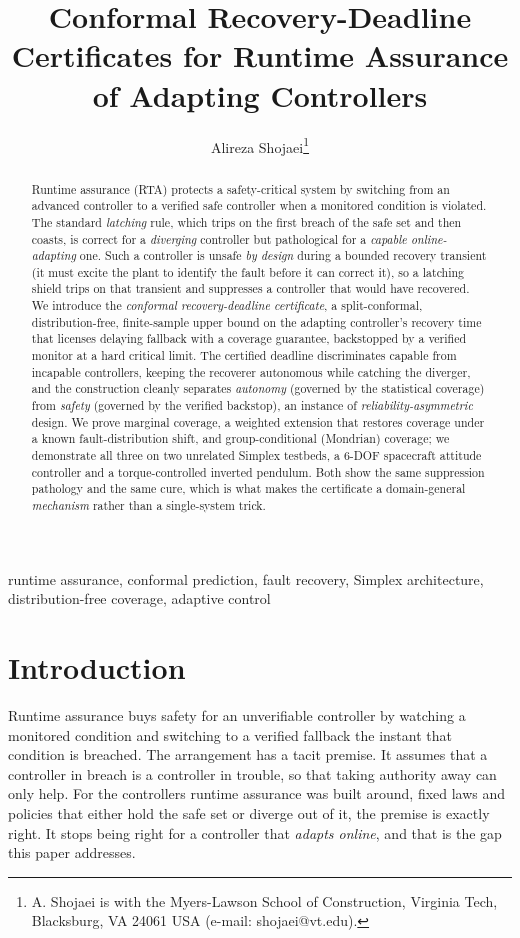 \documentclass[journal]{IEEEtran}
\title{Conformal Recovery-Deadline Certificates for Runtime Assurance of
Adapting Controllers}
\author{Alireza Shojaei\thanks{A. Shojaei is with the Myers-Lawson School of Construction, Virginia Tech, Blacksburg, VA 24061 USA (e-mail: shojaei@vt.edu).}}
\theoremstyle{plain}
\theoremstyle{definition}
\begin{document}
\maketitle

\begin{abstract}
Runtime assurance (RTA) protects a safety-critical system by switching from an advanced
controller to a verified safe controller when a monitored condition is violated. The
standard \emph{latching} rule, which trips on the first breach of the safe set and then
coasts, is correct for a \emph{diverging} controller but pathological for a \emph{capable
online-adapting} one. Such a controller is unsafe \emph{by design} during a bounded
recovery transient (it must excite the plant to identify the fault before it can correct
it), so a latching shield trips on that transient and suppresses a controller that would
have recovered. We introduce the \emph{conformal recovery-deadline certificate}, a
split-conformal, distribution-free, finite-sample upper bound on the adapting controller's
recovery time that licenses delaying fallback with a coverage guarantee, backstopped by a
verified monitor at a hard critical limit. The certified deadline discriminates capable
from incapable controllers, keeping the recoverer autonomous while catching the diverger,
and the construction cleanly separates \emph{autonomy} (governed by the statistical
coverage) from \emph{safety} (governed by the verified backstop), an instance of
\emph{reliability-asymmetric} design. We prove marginal coverage, a weighted extension
that restores coverage under a known fault-distribution shift, and group-conditional
(Mondrian) coverage; we demonstrate all three on two unrelated Simplex testbeds, a 6-DOF
spacecraft attitude controller and a torque-controlled inverted pendulum. Both show the same
suppression pathology and the same cure, which is what makes the certificate a
domain-general \emph{mechanism} rather than a single-system trick.
\end{abstract}

\begin{IEEEkeywords}
runtime assurance, conformal prediction, fault recovery, Simplex architecture, distribution-free coverage, adaptive control
\end{IEEEkeywords}

\section{Introduction}
\label{sec:intro}
Runtime assurance buys safety for an unverifiable controller by watching a monitored
condition and switching to a verified fallback the instant that condition is breached. The
arrangement has a tacit premise. It assumes that a controller in breach is a controller in
trouble, so that taking authority away can only help. For the controllers runtime assurance
was built around, fixed laws and policies that either hold the safe set or diverge out of
it, the premise is exactly right. It stops being right for a controller that \emph{adapts
online}, and that is the gap this paper addresses.
\end{document}
